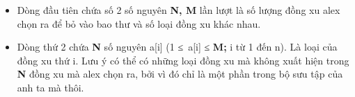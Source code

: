 \begin{itemize}
	\item     Dòng đầu tiên chứa số 2 số nguyên    \textbf{     N, M    }    lần lượt là số lượng đồng xu    alex    chọn ra để bỏ vào bao thư và số loại đồng xu khác nhau.   
	\item     Dòng thứ 2 chứa    \textbf{     N    }    số nguyên a[i] (1 ≤ a[i] ≤    \textbf{     M;    }    i từ 1 đến n). Là loại của đồng xu thứ i. Lưu ý có thể có những loại đồng xu mà không xuất hiện trong    \textbf{     N    }    đồng xu mà    alex    chọn ra, bởi vì đó chỉ là một phần trong bộ sưu tập của anh ta mà thôi.   
\end{itemize}